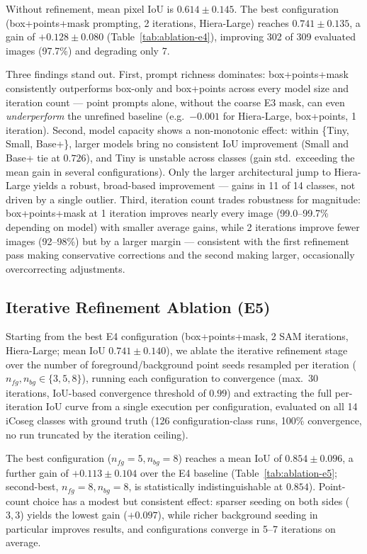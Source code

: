 Without refinement, mean pixel IoU is $0.614 \pm 0.145$. The best
configuration (box+points+mask prompting, 2 iterations, Hiera-Large)
reaches $0.741 \pm 0.135$, a gain of $+0.128 \pm 0.080$
(Table~\ref{tab:ablation-e4}), improving 302 of 309 evaluated images
(97.7\%) and degrading only 7.

Three findings stand out. First, prompt richness dominates:
box+points+mask consistently outperforms box-only and box+points
across every model size and iteration count — point prompts alone,
without the coarse E3 mask, can even \emph{underperform} the
unrefined baseline (e.g.\ $-0.001$ for Hiera-Large, box+points,
1 iteration). Second, model capacity shows a non-monotonic effect:
within \{Tiny, Small, Base+\}, larger models bring no consistent
IoU improvement (Small and Base+ tie at $0.726$), and Tiny is
unstable across classes (gain std.\ exceeding the mean gain in
several configurations). Only the larger architectural jump to
Hiera-Large yields a robust, broad-based improvement — gains in 11
of 14 classes, not driven by a single outlier. Third, iteration
count trades robustness for magnitude: box+points+mask at
1 iteration improves nearly every image (99.0--99.7\% depending on
model) with smaller average gains, while 2 iterations improve fewer
images (92--98\%) but by a larger margin — consistent with the
first refinement pass making conservative corrections and the
second making larger, occasionally overcorrecting adjustments.

\subsection{Iterative Refinement Ablation (E5)}
\label{sec:ablation-e5}

Starting from the best E4 configuration (box+points+mask, 2 SAM
iterations, Hiera-Large; mean IoU $0.741 \pm 0.140$), we ablate the
iterative refinement stage over the number of foreground/background
point seeds resampled per iteration ($n_{fg}, n_{bg} \in
\{3,5,8\}$), running each configuration to convergence
(max.\ 30 iterations, IoU-based convergence threshold of $0.99$) and
extracting the full per-iteration IoU curve from a single execution
per configuration, evaluated on all 14 iCoseg classes with ground
truth (126 configuration-class runs, 100\% convergence, no run
truncated by the iteration ceiling).

The best configuration ($n_{fg}{=}5, n_{bg}{=}8$) reaches a mean
IoU of $0.854 \pm 0.096$, a further gain of $+0.113 \pm 0.104$ over
the E4 baseline (Table~\ref{tab:ablation-e5}; second-best,
$n_{fg}{=}8, n_{bg}{=}8$, is statistically indistinguishable at
$0.854$). Point-count choice has a modest but consistent effect:
sparser seeding on both sides ($3,3$) yields the lowest gain
($+0.097$), while richer background seeding in particular improves
results, and configurations converge in 5--7 iterations on average.

